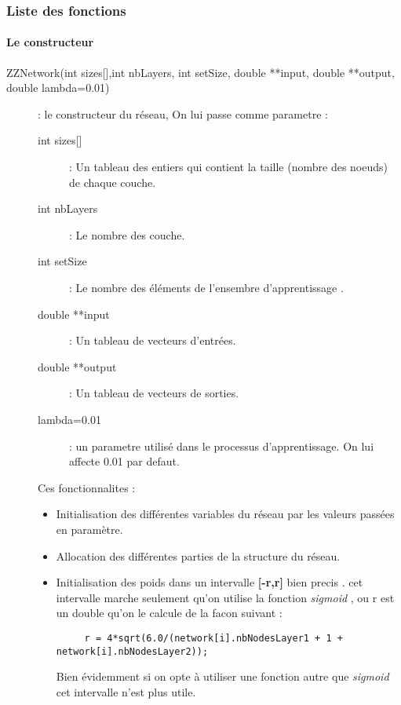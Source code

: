 \subsubsection{Liste des fonctions}

\paragraph{Le constructeur}
\begin{description}
\item[{ZZNetwork(int sizes[],int nbLayers, int setSize, double **input, double **output, double lambda=0.01)}]: le constructeur du réseau, On lui passe comme parametre :
	\begin{description}
		\item[{int sizes[]}] : Un tableau des entiers qui contient la taille (nombre des noeuds) de chaque couche.
        \item[int nbLayers] : Le nombre des couche.
        \item[int setSize] : Le nombre des éléments de l'ensembre d'apprentissage .
        \item[double **input] : Un tableau de vecteurs d'entrées.
        \item[double **output] : Un tableau de vecteurs de sorties.
        \item[lambda=0.01] : un parametre utilisé dans le processus d'apprentissage. On lui affecte 0.01 par defaut.
	\end{description}
Ces fonctionnalites :
\begin{itemize}
\item Initialisation des différentes variables du réseau par les valeurs passées en paramètre.
\item Allocation des différentes parties de la structure du réseau.
\item Initialisation des poids dans un intervalle \textbf{[-r,r]} bien precis . cet intervalle marche seulement qu'on utilise la fonction \textit{sigmoid} , ou r est un double qu'on le calcule de la facon suivant :
\begin{verbatim}
     r = 4*sqrt(6.0/(network[i].nbNodesLayer1 + 1 + network[i].nbNodesLayer2));
\end{verbatim}
Bien évidemment si on opte à utiliser une fonction autre que \textit{sigmoid} cet intervalle n'est plus utile.
\end{itemize}
\end{description}

